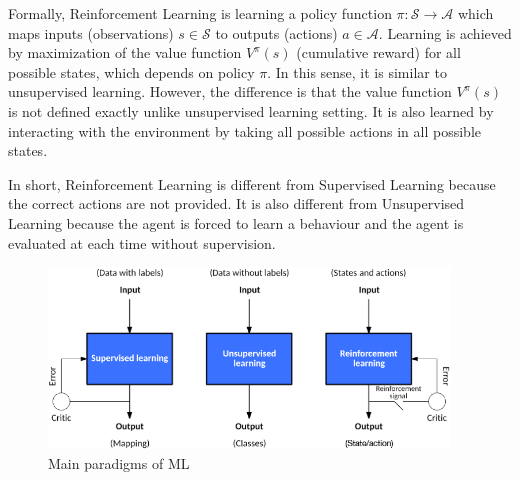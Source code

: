 Formally, Reinforcement Learning is learning a policy function 
$\pi \colon \mathcal{S} \rightarrow \mathcal{A}$ which maps 
inputs (observations) $s \in \mathcal{S}$ to outputs (actions) $a \in \mathcal{A}$. 
Learning is achieved by maximization of the value function $V^{\pi}(s)$ (cumulative reward) for all possible states, which depends on policy $\pi$. 
In this sense, it is similar to unsupervised learning. 
However, the difference is that the value function $V^{\pi}(s)$ is not defined exactly unlike unsupervised learning setting. 
It is also learned by interacting with the environment by taking all possible actions in all possible states. 

In short, Reinforcement Learning is different from Supervised Learning because the correct actions are not provided. 
It is also different from Unsupervised Learning because the agent is forced to learn a behaviour and the agent is evaluated at each time without supervision. 

\begin{figure}
	\centering
	\includegraphics[width=0.95\textwidth]{figures/ml_theory/sl_ul_rl.png}
	\caption{Main paradigms of ML \cite{noauthor_models_nodate}}
	\label{fig:sl_ul_rl}
\end{figure}

